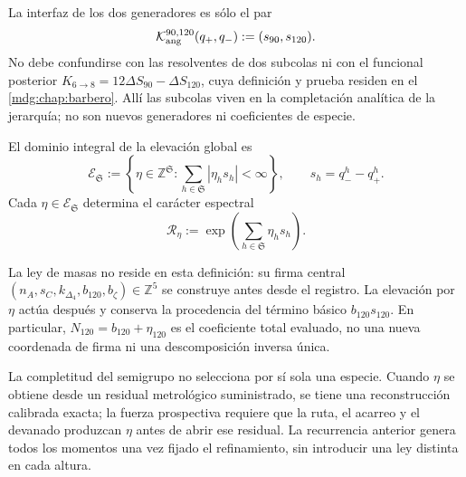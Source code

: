 La interfaz de los dos generadores es sólo el par
\[
 \mathcal K_{\rm ang}^{90,120}(q_+,q_-):=(s_{90},s_{120}).
\]
No debe confundirse con las resolventes de dos subcolas ni con el funcional
posterior \(K_{6\to8}=12\Delta S_{90}-\Delta S_{120}\), cuya definición y
prueba residen en el \cref{mdg:chap:barbero}. Allí las subcolas viven en la
completación analítica de la jerarquía; no son nuevos generadores ni
coeficientes de especie.

\begin{definition}
\label{def:modulo-refinamientos-torre-rev7}
El dominio integral de la elevación global es
\[
 \mathcal E_{\mathfrak S}
 :=\left\{\eta\in\mathbb Z^{\mathfrak S}:
 \sum_{h\in\mathfrak S}|\eta_hs_h|<\infty\right\},
 \qquad s_h=q_-^h-q_+^h.
\]
Cada \(\eta\in\mathcal E_{\mathfrak S}\) determina el carácter espectral
\[
 \mathcal R_\eta
 :=\exp\!\left(\sum_{h\in\mathfrak S}\eta_hs_h\right).
\]
\end{definition}

La ley de masas no reside en esta definición: su firma central
\((n_A,s_C,k_{\Delta_4},b_{120},b_\zeta)\in\mathbb Z^5\) se construye antes
desde el registro. La elevación por \(\eta\) actúa después y conserva la
procedencia del término básico \(b_{120}s_{120}\). En particular,
\(N_{120}=b_{120}+\eta_{120}\) es el coeficiente total evaluado, no una
nueva coordenada de firma ni una descomposición inversa única.

La completitud del semigrupo no selecciona por sí sola una especie. Cuando
\(\eta\) se obtiene desde un residual metrológico suministrado, se tiene una
reconstrucción calibrada exacta; la fuerza prospectiva requiere que la ruta,
el acarreo y el devanado produzcan \(\eta\) antes de abrir ese residual. La
recurrencia anterior genera todos los momentos una vez fijado el
refinamiento, sin introducir una ley distinta en cada altura.
